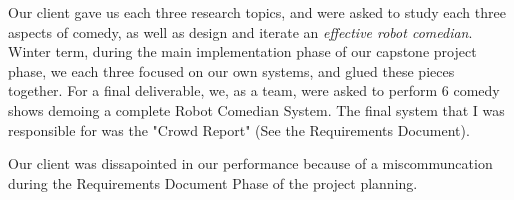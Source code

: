 \documentclass[onecolumn, draftclsnofoot,10pt, compsoc]{IEEEtran}
\begin{document}
		Our client gave us each three research topics, and were asked to study each three aspects of comedy, as well as design and iterate an \textit{effective robot comedian}.
		Winter term, during the main implementation phase of our capstone project phase, we each three focused on our own systems, and glued these pieces together.
		For a final deliverable, we, as a team, were asked to perform 6 comedy shows demoing a complete Robot Comedian System.
		The final system that I was responsible for was the "Crowd Report" (See the Requirements Document). 

		Our client was dissapointed in our performance because of a miscommuncation during the Requirements Document Phase of the project planning.



\pagebreak

\pagebreak
\clearpage
\end{document}
